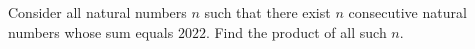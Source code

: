 Consider all natural numbers $n$ such that there exist $n$ consecutive natural numbers whose sum equals $2022$. Find the product of all such $n$.
